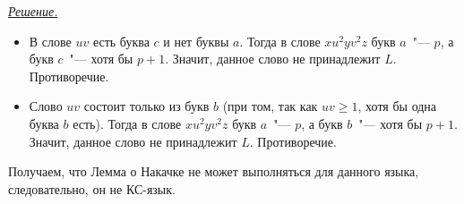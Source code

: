 \documentclass[10pt]{article}
\newcounter{pr} \setcounter{pr}{0}
\newcounter{subpr}[pr] \setcounter{subpr}{0}
\newenvironment{sol}
  {\par
   {\itshape \underline{Решение.}}}
  {}
\renewcommand{\geq}{\geqslant}
\begin{document}
\begin{pr}
\begin{subpr}
\begin{sol}
\begin{itemize}
          \item В слове $uv$ есть буква $c$ и нет буквы $a$. Тогда в
          слове $x u^2 y v^2 z$ букв $a$~"--- $p$, а букв $c$~"--- хотя бы $p +
          1$. Значит, данное слово не принадлежит $L$. Противоречие.

          \item Слово $uv$ состоит только из букв $b$ (при том, так как
          $uv \geq 1$, хотя бы одна буква $b$ есть). Тогда в слове $x u^2 y v^2 z$
          букв $a$~"--- $p$, а букв $b$~"--- хотя бы $p + 1$. Значит, данное слово
          не принадлежит $L$. Противоречие.
        \end{itemize}
        Получаем, что Лемма о Накачке не может выполняться для данного языка,
        следовательно, он не КС-язык.
      \end{sol}
    \end{subpr}
  \end{pr}
\end{document}
